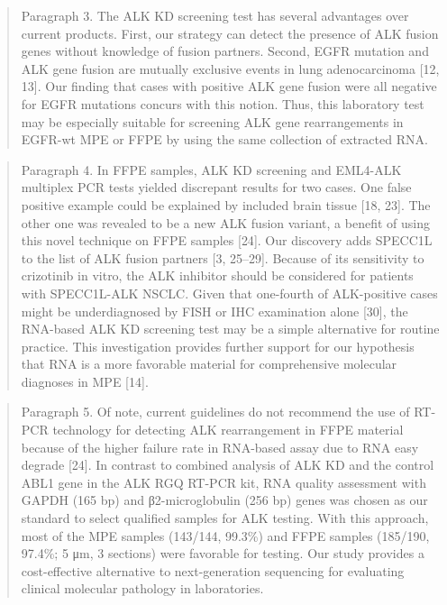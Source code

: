 \documentclass[
]{book}
\begin{document}
\begin{quote}
Paragraph 3. The ALK KD screening test has several advantages over current products. First, our strategy can detect the presence of ALK fusion genes without knowledge of fusion partners. Second, EGFR mutation and ALK gene fusion are mutually exclusive events in lung adenocarcinoma {[}12, 13{]}. Our finding that cases with positive ALK gene fusion were all negative for EGFR mutations concurs with this notion. Thus, this laboratory test may be especially suitable for screening ALK gene rearrangements in EGFR-wt MPE or FFPE by using the same collection of extracted RNA.
\end{quote}

\begin{quote}
Paragraph 4. In FFPE samples, ALK KD screening and EML4-ALK multiplex PCR tests yielded discrepant results for two cases. One false positive example could be explained by included brain tissue {[}18, 23{]}. The other one was revealed to be a new ALK fusion variant, a benefit of using this novel technique on FFPE samples {[}24{]}. Our discovery adds SPECC1L to the list of ALK fusion partners {[}3, 25--29{]}. Because of its sensitivity to crizotinib in vitro, the ALK inhibitor should be considered for patients with SPECC1L-ALK NSCLC. Given that one-fourth of ALK-positive cases might be underdiagnosed by FISH or IHC examination alone {[}30{]}, the RNA-based ALK KD screening test may be a simple alternative for routine practice. This investigation provides further support for our hypothesis that RNA is a more favorable material for comprehensive molecular diagnoses in MPE {[}14{]}.
\end{quote}

\begin{quote}
Paragraph 5. Of note, current guidelines do not recommend the use of RT-PCR technology for detecting ALK rearrangement in FFPE material because of the higher failure rate in RNA-based assay due to RNA easy degrade {[}24{]}. In contrast to combined analysis of ALK KD and the control ABL1 gene in the ALK RGQ RT-PCR kit, RNA quality assessment with GAPDH (165 bp) and β2-microglobulin (256 bp) genes was chosen as our standard to select qualified samples for ALK testing. With this approach, most of the MPE samples (143/144, 99.3\%) and FFPE samples (185/190, 97.4\%; 5 μm, 3 sections) were favorable for testing. Our study provides a cost-effective alternative to next-generation sequencing for evaluating clinical molecular pathology in laboratories.
\end{quote}
\end{document}
